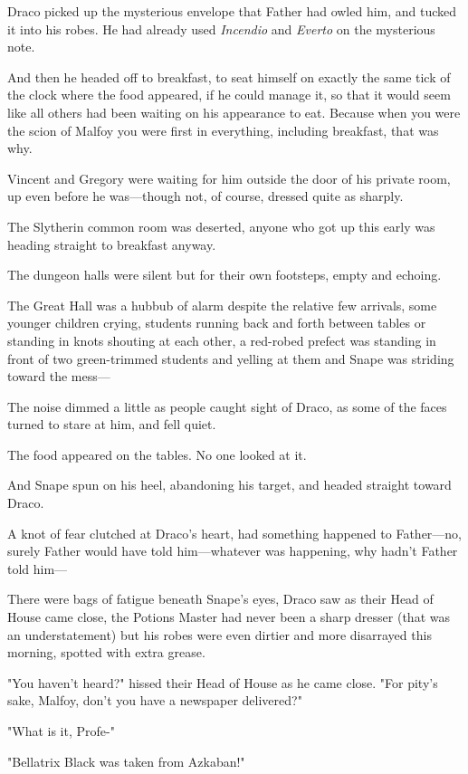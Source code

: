 Draco picked up the mysterious envelope that Father had owled him, and tucked 
it into his robes. He had already used \emph{Incendio} and \emph{Everto} on the 
mysterious note.

And then he headed off to breakfast, to seat himself on exactly the same tick 
of the clock where the food appeared, if he could manage it, so that it would 
seem like all others had been waiting on his appearance to eat. Because when 
you were the scion of Malfoy you were first in everything, including breakfast, 
that was why.

Vincent and Gregory were waiting for him outside the door of his private room, 
up even before he was---though not, of course, dressed quite as sharply.

The Slytherin common room was deserted, anyone who got up this early was 
heading straight to breakfast anyway.

The dungeon halls were silent but for their own footsteps, empty and echoing.

The Great Hall was a hubbub of alarm despite the relative few arrivals, some 
younger children crying, students running back and forth between tables or 
standing in knots shouting at each other, a red-robed prefect was standing in 
front of two green-trimmed students and yelling at them and Snape was striding 
toward the mess---

The noise dimmed a little as people caught sight of Draco, as some of the faces 
turned to stare at him, and fell quiet.

The food appeared on the tables. No one looked at it.

And Snape spun on his heel, abandoning his target, and headed straight toward 
Draco.

A knot of fear clutched at Draco's heart, had something happened to 
Father---no, surely Father would have told him---whatever was happening, why 
hadn't Father told him---

There were bags of fatigue beneath Snape's eyes, Draco saw as their Head of 
House came close, the Potions Master had never been a sharp dresser (that was 
an understatement) but his robes were even dirtier and more disarrayed this 
morning, spotted with extra grease.

"You haven't heard?" hissed their Head of House as he came close. "For pity's 
sake, Malfoy, don't you have a newspaper delivered?"

"What is it, Profe-"

"Bellatrix Black was taken from Azkaban!"

